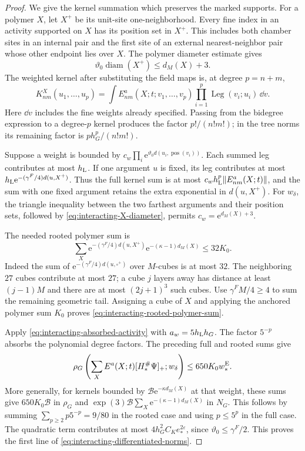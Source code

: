 \begin{proof}
We give the kernel summation which preserves
the marked supports. For a polymer $X$, let
$X^+$ be its unit-site one-neighborhood.
Every fine index in an activity supported on
$X$ has its position set in $X^+$. This
includes both chamber sites in an internal
pair and the first site of an external
nearest-neighbor pair whose other endpoint
lies over $X$. The polymer diameter estimate
gives
\begin{equation}\label{eq:interacting-X-diameter}
 \vartheta_0\operatorname{diam}(X^+)\le d_M(X)+3 .
\end{equation}
The weighted kernel after substituting the
field maps is, at degree $p=n+m$,
\[
 K_{nm}^X(u_1,\ldots,u_p)=
 \int E^a_{nm}(X;t;v_1,\ldots,v_p)
           \prod_{i=1}^p\operatorname{Leg}(v_i;u_i)\,\dd v .
\]
Here $\dd v$ includes the fine weights already
specified. Passing from the bidegree expression
to a degree-$p$ kernel produces the factor
$p!/(n!m!)$; in the tree norms its remaining
factor is $p h_G^p/(n!m!)$.

Suppose a weight is bounded by
$c_w\prod_i \mathrm e^{\vartheta_0d(u_i,\operatorname{pos}(v_i))}$.
Each summed leg contributes at most $h_{\rm L}$.
If one argument $u$ is fixed, its leg contributes
at most
$h_{\rm L}\mathrm e^{-(\gamma^F/4)d(u,X^+)}$.
Thus the full kernel sum is at most
$c_wh_{\rm L}^p\|E^a_{nm}(X;t)\|$, and the
sum with one fixed argument retains the
extra exponential in $d(u,X^+)$.
For $w_\delta$, the triangle inequality between
the two farthest arguments and their position
sets, followed by \eqref{eq:interacting-X-diameter},
permits $c_w=\mathrm e^{d_M(X)+3}$.

The needed rooted polymer sum is
\begin{equation}\label{eq:interacting-rooted-polymer-sum}
 \sum_X \mathrm e^{-(\gamma^F/4)d(u,X^+)}
                       \mathrm e^{-(\kappa-1)d_M(X)}\le32K_0.
\end{equation}
Indeed the sum of
$\mathrm e^{-(\gamma^F/4)d(u,\square^+)}$ over $M$-cubes
is at most $32$. The neighboring $27$ cubes
contribute at most $27$; a cube $j$ layers
away has distance at least $(j-1)M$ and there
are at most $(2j+1)^3$ such cubes.
Use $\gamma^FM/4\ge4$ to sum the remaining
geometric tail. Assigning a cube of $X$
and applying the anchored polymer sum $K_0$
proves \eqref{eq:interacting-rooted-polymer-sum}.

Apply \eqref{eq:interacting-absorbed-activity}
with $a_w=5h_{\rm L}h_G$. The factor $5^{-p}$
absorbs the polynomial degree factors.
The preceding full and rooted sums give
\[
 \rho_G\left(\sum_X E^a(X;t)[H_*^\#\Psi]_+;w_\delta\right)
                                       \le650K_0w_*^{\rm E}.
\]
More generally, for kernels bounded by
$\mathcal B \mathrm e^{-\kappa d_M(X)}$ at that
weight, these sums give
$650K_0\mathcal B$ in $\rho_G$ and
$\exp(3)\mathcal B\sum_X\mathrm e^{-(\kappa-1)d_M(X)}$
in $N_G$. This follows by summing
$\sum_{p\ge2}p5^{-p}=9/80$ in the rooted
case and using $p\le5^p$ in the full case.
The quadratic term contributes at most
$4h_G^2C_Ke_*^{2\varepsilon}$, since
$\vartheta_0\le\gamma^F/2$. This proves the
first line of \eqref{eq:interacting-differentiated-norms}.


\end{proof}

